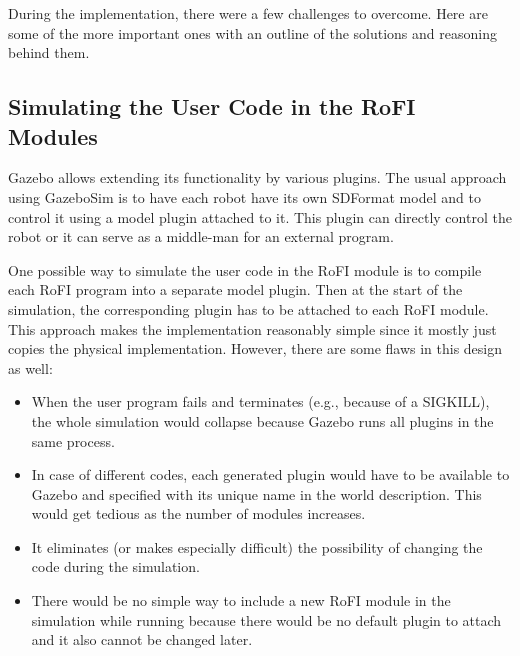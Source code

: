 \documentclass[
  printed, %
  color,   %
  notable, %
  oneside, %
  nolof,   %
  nolot,   %
  nocover,
]{fithesis3}
\begin{document}
During the implementation, there were a few challenges to overcome.
Here are some of the more important ones with an outline of the solutions and reasoning behind them.

\subsection{Simulating the User Code in the RoFI Modules}

Gazebo allows extending its functionality by various plugins.
The usual approach using GazeboSim is to have each robot have its own SDFormat model and to control it using a model plugin attached to it.
This plugin can directly control the robot or it can serve as a middle-man for an external program.

One possible way to simulate the user code in the RoFI module is to compile each RoFI program into a separate model plugin.
Then at the start of the simulation, the corresponding plugin has to be attached to each RoFI module.
This approach makes the implementation reasonably simple since it mostly just copies the physical implementation.
However, there are some flaws in this design as well:
\begin{itemize}
    \item When the user program fails and terminates (e.g., because of a SIGKILL), the whole simulation would collapse because Gazebo runs all plugins in the same process.
    \item In case of different codes, each generated plugin would have to be available to Gazebo and specified with its unique name in the world description.
    This would get tedious as the number of modules increases.
    \item It eliminates (or makes especially difficult) the possibility of changing the code during the simulation.
    \item There would be no simple way to include a new RoFI module in the simulation while running because there would be no default plugin to attach and it also cannot be changed later.
\end{itemize}
\end{document}
